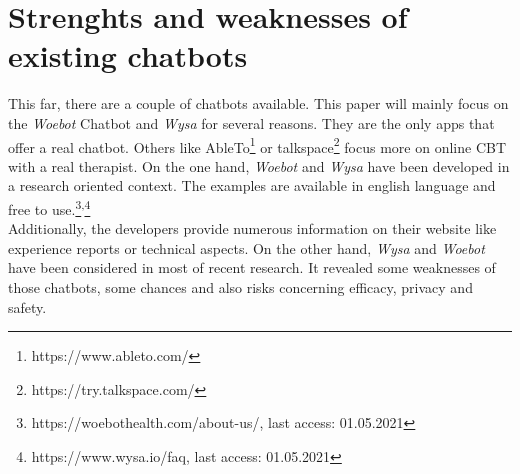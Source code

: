 \documentclass[sigconf, nonacm]{acmart}
\begin{document}
\section{Strenghts and weaknesses of existing chatbots}
\label{sec:two}
This far, there are a couple of chatbots available. This paper will mainly focus on the \emph{Woebot} Chatbot and \emph{Wysa} for several reasons.
They are the only apps that offer a real chatbot. Others like AbleTo\footnote{https://www.ableto.com/} or talkspace\footnote{https://try.talkspace.com/} focus more on online CBT with a real therapist.
On the one hand, \emph{Woebot} and \emph{Wysa} have been developed in a research oriented context. 
The examples are available in english language and free to use.\footnote{https://woebothealth.com/about-us/, last access: 01.05.2021}\textsuperscript{,}\footnote{https://www.wysa.io/faq, last access: 01.05.2021}
\\
Additionally, the developers provide numerous information on their website
like experience reports or technical aspects.
On the other hand, \emph{Wysa} and \emph{Woebot} have been considered in most of recent research.
It revealed some weaknesses of those chatbots, some chances and also risks concerning efficacy, privacy and safety.
\end{document}
